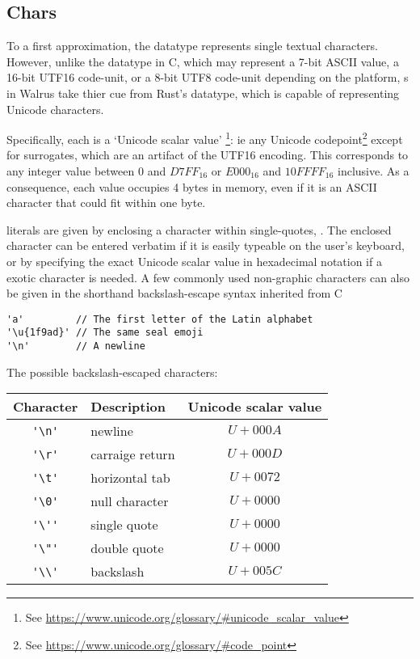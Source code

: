 \subsection{Chars}\label{section:reference:chars}
To a first approximation, the  datatype represents single textual characters.
However, unlike the  datatype in C, which may represent a 7-bit ASCII value,
a 16-bit UTF16 code-unit, or a 8-bit UTF8 code-unit depending on the platform,
s in Walrus take thier cue from Rust's  datatype, which is capable of
representing Unicode characters.

Specifically, each  is a `Unicode scalar value'
\footnote{See \url{https://www.unicode.org/glossary/#unicode_scalar_value}}:
ie any Unicode codepoint\footnote{See \url{https://www.unicode.org/glossary/#code_point}} except for surrogates, which are an artifact of the UTF16 encoding.
This corresponds to any integer value between $0$ and $D7FF_{16}$ or $E000_{16}$ and $10FFFF_{16}$
inclusive.
As a consequence, each  value occupies 4 bytes in memory, even if it is an ASCII character that could
fit within one byte.

 literals are given by enclosing a character within single-quotes, . The enclosed character can be entered verbatim
if it is easily typeable on the user's keyboard, or by specifying the exact Unicode scalar value in hexadecimal notation if a exotic character is needed.
A few commonly used non-graphic characters can also be given in the shorthand backslash-escape syntax inherited from C

\begin{verbatim}
'a'         // The first letter of the Latin alphabet
'\u{1f9ad}' // The same seal emoji 
'\n'        // A newline
\end{verbatim}

The possible backslash-escaped characters:

\begin{tabular}{ clc }
    Character              & Description     & Unicode scalar value \\
    \toprule
    \verb$'\n'$ & newline         & $U+000A$             \\
    \verb$'\r'$ & carraige return & $U+000D$             \\
    \verb$'\t'$ & horizontal tab  & $U+0072$             \\
    \verb$'\0'$ & null character  & $U+0000$             \\
    \verb$'\''$ & single quote    & $U+0000$             \\
    \verb$'\"'$ & double quote    & $U+0000$             \\
    \verb$'\\'$ & backslash       & $U+005C$             \\
    \bottomrule
\end{tabular}

